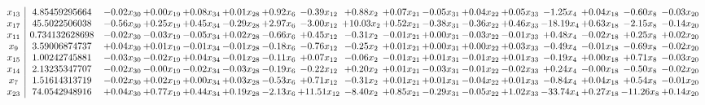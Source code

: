 \documentclass[9pt]{article}
\begin{document}
 \[\begin{array}{c| c c@{\hskip 2pt} c@{\hskip 2pt} c@{\hskip 2pt} c@{\hskip 2pt} c@{\hskip 2pt} c@{\hskip 2pt} c@{\hskip 2pt} c@{\hskip 2pt} c@{\hskip 2pt} c@{\hskip 2pt} c@{\hskip 2pt} c@{\hskip 2pt} c@{\hskip 2pt} c@{\hskip 2pt} c@{\hskip 2pt} }
 x_{13}   &  4.85459295664 & -0.02 x_{30} & +  0.00 x_{19} & +  0.08 x_{34} & +  0.01 x_{28} & +  0.92 x_{6} & -0.39 x_{12} & +  0.88 x_{2} & +  0.07 x_{21} & -0.05 x_{31} & +  0.04 x_{22} & +  0.05 x_{33} & -1.25 x_{4} & +  0.04 x_{18} & -0.60 x_{8} & -0.03 x_{20}\\
 x_{17}   &  45.5022506038 & -0.56 x_{30} & +  0.25 x_{19} & +  0.45 x_{34} & -0.29 x_{28} & +  2.97 x_{6} & -3.00 x_{12} & + 10.03 x_{2} & +  0.52 x_{21} & -0.38 x_{31} & -0.36 x_{22} & +  0.46 x_{33} & -18.19 x_{4} & +  0.63 x_{18} & -2.15 x_{8} & -0.14 x_{20}\\
 x_{11}   &  0.734132628698 & -0.02 x_{30} & -0.03 x_{19} & -0.05 x_{34} & +  0.02 x_{28} & -0.66 x_{6} & +  0.45 x_{12} & -0.31 x_{2} & -0.01 x_{21} & +  0.00 x_{31} & -0.03 x_{22} & -0.01 x_{33} & +  0.48 x_{4} & -0.02 x_{18} & +  0.25 x_{8} & +  0.02 x_{20}\\
 x_{9}   &  3.59006874737 & +  0.04 x_{30} & +  0.01 x_{19} & -0.01 x_{34} & -0.01 x_{28} & -0.18 x_{6} & -0.76 x_{12} & -0.25 x_{2} & +  0.01 x_{21} & +  0.00 x_{31} & +  0.00 x_{22} & +  0.03 x_{33} & -0.49 x_{4} & -0.01 x_{18} & -0.69 x_{8} & -0.02 x_{20}\\
 x_{15}   &  1.00242745881 & -0.03 x_{30} & -0.02 x_{19} & +  0.04 x_{34} & -0.01 x_{28} & -0.11 x_{6} & +  0.07 x_{12} & -0.06 x_{2} & -0.01 x_{21} & +  0.01 x_{31} & -0.01 x_{22} & +  0.01 x_{33} & -0.19 x_{4} & +  0.00 x_{18} & +  0.71 x_{8} & -0.03 x_{20}\\
 x_{14}   &  2.13235347707 & -0.02 x_{30} & -0.00 x_{19} & -0.02 x_{34} & -0.03 x_{28} & -0.19 x_{6} & -0.22 x_{12} & +  0.20 x_{2} & +  0.01 x_{21} & -0.03 x_{31} & -0.01 x_{22} & -0.02 x_{33} & +  0.24 x_{4} & -0.00 x_{18} & -0.50 x_{8} & -0.02 x_{20}\\
 x_{7}   &  1.51614313719 & -0.02 x_{30} & +  0.02 x_{19} & +  0.00 x_{34} & +  0.03 x_{28} & -0.53 x_{6} & +  0.71 x_{12} & -0.31 x_{2} & +  0.01 x_{21} & +  0.01 x_{31} & -0.04 x_{22} & +  0.01 x_{33} & -0.84 x_{4} & +  0.04 x_{18} & +  0.54 x_{8} & -0.01 x_{20}\\
 x_{23}   &  74.0542948916 & +  0.04 x_{30} & +  0.77 x_{19} & +  0.44 x_{34} & +  0.19 x_{28} & -2.13 x_{6} & + 11.51 x_{12} & -8.40 x_{2} & +  0.85 x_{21} & -0.29 x_{31} & -0.05 x_{22} & +  1.02 x_{33} & -33.74 x_{4} & +  0.27 x_{18} & -11.26 x_{8} & +  0.14 x_{20}\\

\end{array}\]
\end{document}
